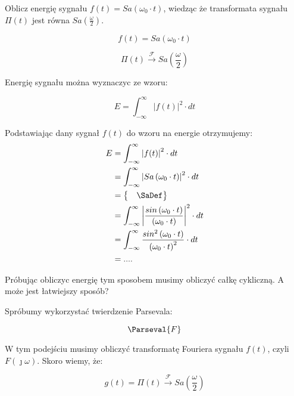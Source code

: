 \begin{task}
Oblicz energię sygnału $f(t)=Sa\left(\omega_0 \cdot t\right)$, wiedząc że transformata sygnału $\Pi(t)$ jest równa $Sa\left(\frac{\omega}{2}\right)$.

\begin{equation}
f(t) = Sa\left(\omega_0 \cdot t\right)
\end{equation}

\begin{equation}
\Pi(t) \xrightarrow{\mathcal F} Sa\left(\frac{\omega}{2}\right)
\end{equation}

Energię sygnału można wyznaczyc ze wzoru:

\begin{equation}
E= \int_{-\infty }^{\infty}\left|f(t)\right| ^2 \cdot dt
\end{equation}

Podstawiając dany sygnał $f(t)$ do wzoru na energie otrzymujemy:
\begin{align*}
E &= \int_{-\infty }^{\infty}\left|f(t)\right| ^2 \cdot dt\\
&= \int_{-\infty }^{\infty}\left|Sa\left(\omega_0 \cdot t\right)\right| ^2 \cdot dt\\
&=\begin{Bmatrix}
&\SaDef
\end{Bmatrix}\\
&= \int_{-\infty }^{\infty}\left|\frac{sin\left(\omega_0 \cdot t\right)}{\left(\omega_0 \cdot t\right)}\right| ^2 \cdot dt\\
&= \int_{-\infty }^{\infty}\frac{sin^2\left(\omega_0 \cdot t\right)}{\left(\omega_0 \cdot t\right)^2} \cdot dt\\
&=....
\end{align*}

Próbując obliczyc energię tym sposobem musimy obliczyć całkę cykliczną. A może jest łatwiejszy sposób?

Spróbumy wykorzystać twierdzenie Parsevala:

\begin{equation}
\Parseval{F}
\end{equation}

W tym podejściu musimy obliczyć transformatę Fouriera sygnału $f(t)$, czyli $F(\jmath \omega)$.
Skoro wiemy, że:

\begin{equation}
g(t) = \Pi(t) \xrightarrow{\mathcal F} Sa\left(\frac{\omega}{2}\right)
\end{equation}


\end{task}
